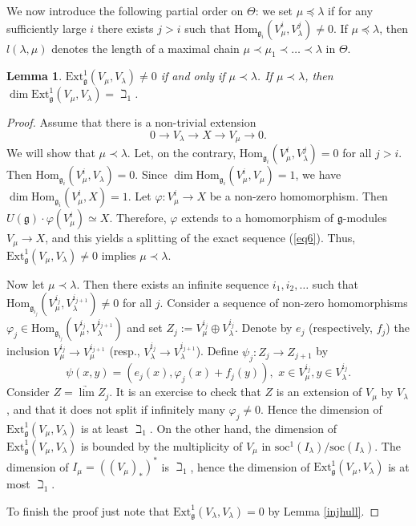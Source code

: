 \documentclass{birkmult}
\newcounter{theorem}
\newtheorem{lemma}[theo]{Lemma}
\renewcommand{\gg}{\mathfrak{g}}
\renewcommand {\phi} {\varphi}
\newcommand{\refeq}[1]{(\ref{#1})}
\newcommand{\ext}{\mathrm{Ext}}
\newcommand{\soc}{\mathrm{soc}}
\renewcommand{\hom}{\mathrm{Hom}}
\begin{document}
We now introduce the following partial order on $\Theta$: we set
$\mu\preceq\lambda$ if for any sufficiently large $i$ there exists
$j>i$ such that $\hom_{\gg_i}(V^i_\mu,V^j_\lambda)\neq 0$. If
$\mu\preceq\lambda$, then $l(\lambda,\mu)$ denotes the length of a
maximal chain $\mu\prec \mu_1\prec \dots\prec \lambda$ in $\Theta$.

\begin{lemma}\label{extsimp} $\ext^1_\gg(V_\mu,V_\lambda)\neq 0$ if and only if $\mu\prec\lambda$. If $\mu\prec\lambda$, then $\dim\ext^1_\gg(V_\mu,V_\lambda)=\beth_1$.
\end{lemma}
\begin{proof} Assume that there is a non-trivial extension
\begin{equation}\label{eq6}
0\to V_\lambda\to X\to V_\mu\to 0.\end{equation} We will show that
$\mu\prec\lambda$. Let, on the contrary,
$\hom_{\gg_i}(V^i_\mu,V^j_\lambda)=0$ for all $j>i$. Then
$\hom_{\gg_i}(V^i_\mu,V_\lambda)=0$. Since
$\dim\hom_{\gg_i}(V^i_\mu,V_\mu)=1$, we have
$\dim\hom_{\gg_i}(V^i_\mu,X)=1$. Let $\phi:V^i_\mu\to X$ be a
non-zero homomorphism. Then $U(\gg)\cdot\phi(V^i_\mu)\simeq X$.
Therefore, $\phi$ extends to a homomorphism of $\gg$-modules
$V_\mu\to X$, and this yields a splitting of the exact sequence
\refeq{eq6}. Thus, $\ext^1_\gg(V_\mu,V_\lambda)\neq 0$ implies
$\mu\prec\lambda$.

Now let $\mu\prec\lambda$. Then there exists an infinite sequence
$i_1,i_2,\dots$ such that $\hom_{\gg_{i_j}}(V^{i_j}_\mu,
V^{i_{j+1}}_\lambda)\neq 0$ for all $j$. Consider a sequence of
non-zero homomorphisms $\phi_j\in
\hom_{\gg_{i_j}}(V^{i_j}_\mu,V^{i_{j+1}}_\lambda)$ and set
$Z_j:=V^{i_j}_\mu\oplus V^{i_j}_\lambda$. Denote by $e_j$
(respectively, $f_j$) the inclusion $V^{i_j}_\mu\to
V^{i_{j+1}}_\mu$ (resp., $V^{i_j}_\lambda\to
V^{i_{j+1}}_\lambda$). Define $\psi_j:Z_j\to Z_{j+1}$ by
$$\psi(x,y)=(e_j(x),\phi_j(x)+f_j(y)),\,\,x\in V^{i_j}_\mu, y\in V^{i_{j}}_\lambda.$$
Consider $Z=\underrightarrow{\lim} Z_j$. It is an exercise to
check that $Z$ is an extension of $V_\mu$ by $V_\lambda$, and that it
does not split if infinitely many $\phi_j\neq 0$. Hence the
dimension of $\ext^1_\gg(V_\mu,V_\lambda)$ is at least $\beth_1$. On
the other hand, the dimension of $\ext^1_\gg(V_\mu,V_\lambda)$ is
bounded by the multiplicity of $V_\mu$ in
$\soc^1(I_\lambda)/\soc(I_\lambda)$. The dimension of
$I_\mu=((V_\mu)_*)^*$ is $\beth_1$, hence the dimension of
$\ext^1_\gg(V_\mu,V_\lambda)$ is at most $\beth_1$.

To finish the proof just note that
$\ext^1_\gg(V_\lambda,V_\lambda)=0$ by Lemma \ref{injhull}.
\end{proof}
\end{document}
